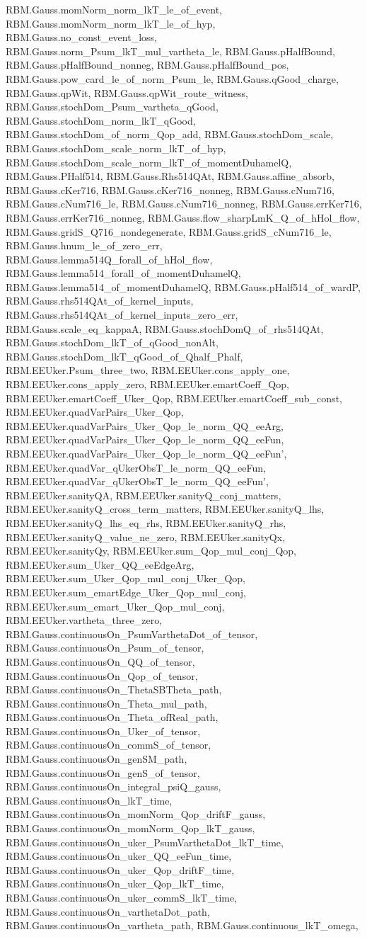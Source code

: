 \begin{theorem}
RBM.Gauss.momNorm_norm_lkT_le_of_event, RBM.Gauss.momNorm_norm_lkT_le_of_hyp, RBM.Gauss.no_const_event_loss, RBM.Gauss.norm_Psum_lkT_mul_vartheta_le, RBM.Gauss.pHalfBound, RBM.Gauss.pHalfBound_nonneg, RBM.Gauss.pHalfBound_pos, RBM.Gauss.pow_card_le_of_norm_Psum_le, RBM.Gauss.qGood_charge, RBM.Gauss.qpWit, RBM.Gauss.qpWit_route_witness, RBM.Gauss.stochDom_Psum_vartheta_qGood, RBM.Gauss.stochDom_norm_lkT_qGood, RBM.Gauss.stochDom_of_norm_Qop_add, RBM.Gauss.stochDom_scale, RBM.Gauss.stochDom_scale_norm_lkT_of_hyp, RBM.Gauss.stochDom_scale_norm_lkT_of_momentDuhamelQ, RBM.Gauss.PHalf514, RBM.Gauss.Rhs514QAt, RBM.Gauss.affine_absorb, RBM.Gauss.cKer716, RBM.Gauss.cKer716_nonneg, RBM.Gauss.cNum716, RBM.Gauss.cNum716_le, RBM.Gauss.cNum716_nonneg, RBM.Gauss.errKer716, RBM.Gauss.errKer716_nonneg, RBM.Gauss.flow_sharpLmK_Q_of_hHol_flow, RBM.Gauss.gridS_Q716_nondegenerate, RBM.Gauss.gridS_cNum716_le, RBM.Gauss.hnum_le_of_zero_err, RBM.Gauss.lemma514Q_forall_of_hHol_flow, RBM.Gauss.lemma514_forall_of_momentDuhamelQ, RBM.Gauss.lemma514_of_momentDuhamelQ, RBM.Gauss.pHalf514_of_wardP, RBM.Gauss.rhs514QAt_of_kernel_inputs, RBM.Gauss.rhs514QAt_of_kernel_inputs_zero_err, RBM.Gauss.scale_eq_kappaA, RBM.Gauss.stochDomQ_of_rhs514QAt, RBM.Gauss.stochDom_lkT_of_qGood_nonAlt, RBM.Gauss.stochDom_lkT_qGood_of_Qhalf_Phalf, RBM.EEUker.Psum_three_two, RBM.EEUker.cons_apply_one, RBM.EEUker.cons_apply_zero, RBM.EEUker.emartCoeff_Qop, RBM.EEUker.emartCoeff_Uker_Qop, RBM.EEUker.emartCoeff_sub_const, RBM.EEUker.quadVarPairs_Uker_Qop, RBM.EEUker.quadVarPairs_Uker_Qop_le_norm_QQ_eeArg, RBM.EEUker.quadVarPairs_Uker_Qop_le_norm_QQ_eeFun, RBM.EEUker.quadVarPairs_Uker_Qop_le_norm_QQ_eeFun', RBM.EEUker.quadVar_qUkerObsT_le_norm_QQ_eeFun, RBM.EEUker.quadVar_qUkerObsT_le_norm_QQ_eeFun', RBM.EEUker.sanityQA, RBM.EEUker.sanityQ_conj_matters, RBM.EEUker.sanityQ_cross_term_matters, RBM.EEUker.sanityQ_lhs, RBM.EEUker.sanityQ_lhs_eq_rhs, RBM.EEUker.sanityQ_rhs, RBM.EEUker.sanityQ_value_ne_zero, RBM.EEUker.sanityQx, RBM.EEUker.sanityQy, RBM.EEUker.sum_Qop_mul_conj_Qop, RBM.EEUker.sum_Uker_QQ_eeEdgeArg, RBM.EEUker.sum_Uker_Qop_mul_conj_Uker_Qop, RBM.EEUker.sum_emartEdge_Uker_Qop_mul_conj, RBM.EEUker.sum_emart_Uker_Qop_mul_conj, RBM.EEUker.vartheta_three_zero, RBM.Gauss.continuousOn_PsumVarthetaDot_of_tensor, RBM.Gauss.continuousOn_Psum_of_tensor, RBM.Gauss.continuousOn_QQ_of_tensor, RBM.Gauss.continuousOn_Qop_of_tensor, RBM.Gauss.continuousOn_ThetaSBTheta_path, RBM.Gauss.continuousOn_Theta_mul_path, RBM.Gauss.continuousOn_Theta_ofReal_path, RBM.Gauss.continuousOn_Uker_of_tensor, RBM.Gauss.continuousOn_commS_of_tensor, RBM.Gauss.continuousOn_genSM_path, RBM.Gauss.continuousOn_genS_of_tensor, RBM.Gauss.continuousOn_integral_psiQ_gauss, RBM.Gauss.continuousOn_lkT_time, RBM.Gauss.continuousOn_momNorm_Qop_driftF_gauss, RBM.Gauss.continuousOn_momNorm_Qop_lkT_gauss, RBM.Gauss.continuousOn_uker_PsumVarthetaDot_lkT_time, RBM.Gauss.continuousOn_uker_QQ_eeFun_time, RBM.Gauss.continuousOn_uker_Qop_driftF_time, RBM.Gauss.continuousOn_uker_Qop_lkT_time, RBM.Gauss.continuousOn_uker_commS_lkT_time, RBM.Gauss.continuousOn_varthetaDot_path, RBM.Gauss.continuousOn_vartheta_path, RBM.Gauss.continuous_lkT_omega, 
\end{theorem}
